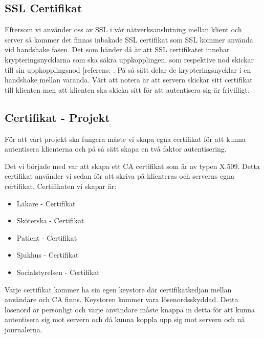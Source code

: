 \subsection{SSL Certifikat}
Eftersom vi använder oss av SSL i vår nätverksanslutning mellan klient och server så kommer det finnas inbakade SSL certifikat som SSL kommer använda vid handshake fasen. Det som händer då är att SSL certifikatet innehar krypteringsnycklarna som ska säkra uppkopplingen, som respektive nod skickar till sin uppkopplingsnod [referens: \cite{SSL}. På så sätt delar de krypteringsnycklar i en handshake mellan varanda. Värt att notera är att servern skickar sitt certifikat till klienten men att klienten ska skicka sitt för att autentisera sig är frivilligt.

\subsection{Certifikat - Projekt}
För att vårt projekt ska fungera måste vi skapa egna certifikat för att kunna autentisera klienterna och på så sätt skapa en två faktor autentisering. 

Det vi började med var att skapa ett CA certifikat som är av typen X.509. Detta certifikat använder vi sedan för att skriva på klienteras och serverns egna certifikat. Certifikaten vi skapar är:

\begin{itemize}
\item{Läkare - Certifikat}
\item{Sköterska - Certifikat}
\item{Patient - Certifikat}
\item{Sjukhus - Certifikat}
\item{Socialstyrelsen - Certifikat}
\end{itemize}

Varje certifikat kommer ha sin egen keystore där certifikatkedjan mellan användare och CA finns. Keystoren kommer vara lösenordsskyddad. Detta lösenord är personligt och varje användare måste knappa in detta för att kunna autentisera sig mot servern och då kunna koppla upp sig mot servern och nå journalerna. 